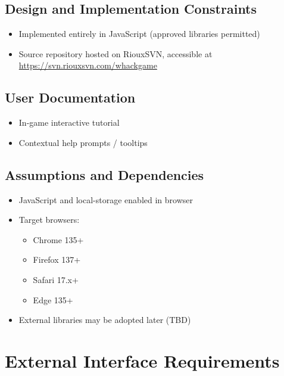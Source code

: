 \documentclass[11pt]{scrreprt}
\begin{document}
\section{Design and Implementation Constraints}
\begin{itemize}
  \item Implemented entirely in JavaScript (approved libraries permitted)
  \item Source repository hosted on RiouxSVN, accessible at \url{https://svn.riouxsvn.com/whackgame}
\end{itemize}

\section{User Documentation}
\begin{itemize}
  \item In-game interactive tutorial
  \item Contextual help prompts / tooltips
\end{itemize}

\section{Assumptions and Dependencies}
\begin{itemize}
  \item JavaScript and local-storage enabled in browser
  \item Target browsers:
    \begin{itemize}
      \item Chrome 135+
      \item Firefox 137+
      \item Safari 17.x+
      \item Edge 135+
    \end{itemize}
  \item External libraries may be adopted later (TBD)
\end{itemize}

\chapter{External Interface Requirements}
\end{document}
